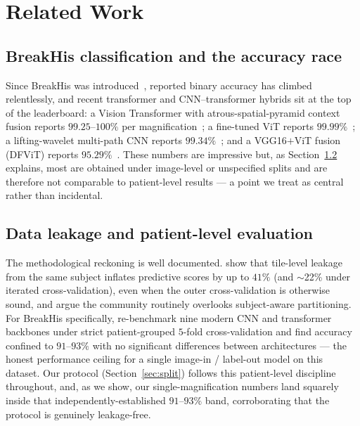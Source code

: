\documentclass[11pt]{article}
\begin{document}
\section{Related Work}
\label{sec:related}

\subsection{BreakHis classification and the accuracy race}
Since BreakHis was introduced~\citep{spanhol2016breakhis}, reported binary accuracy
has climbed relentlessly, and recent transformer and CNN--transformer hybrids sit
at the top of the leaderboard: a Vision Transformer with atrous-spatial-pyramid
context fusion reports $99.25$--$100\%$ per magnification~\citep{scirep2024vitaspp};
a fine-tuned ViT reports $99.99\%$~\citep{gella2024vit}; a lifting-wavelet
multi-path CNN reports $99.34\%$~\citep{lwtmpcnn2026}; and a VGG16$+$ViT fusion
(DFViT) reports $95.29\%$~\citep{dfvit2024}. These numbers are impressive but, as
Section~\ref{sec:leakage} explains, most are obtained under image-level or
unspecified splits and are therefore not comparable to patient-level results — a
point we treat as central rather than incidental.

\subsection{Data leakage and patient-level evaluation}
\label{sec:leakage}
The methodological reckoning is well documented. \citet{bussola2020leakage} show
that tile-level leakage from the same subject inflates predictive scores by up to
$41\%$ (and $\sim$22\% under iterated cross-validation), even when the outer
cross-validation is otherwise sound, and argue the community routinely overlooks
subject-aware partitioning. For BreakHis specifically,
\citet{priyanka2026patientaware} re-benchmark nine modern CNN and transformer
backbones under strict patient-grouped $5$-fold cross-validation and find accuracy
confined to $91$--$93\%$ with no significant differences between architectures —
the honest performance ceiling for a single image-in / label-out model on this
dataset. Our protocol (Section~\ref{sec:split}) follows this patient-level
discipline throughout, and, as we show, our single-magnification numbers land
squarely inside that independently-established $91$--$93\%$ band, corroborating that
the protocol is genuinely leakage-free.
\end{document}
